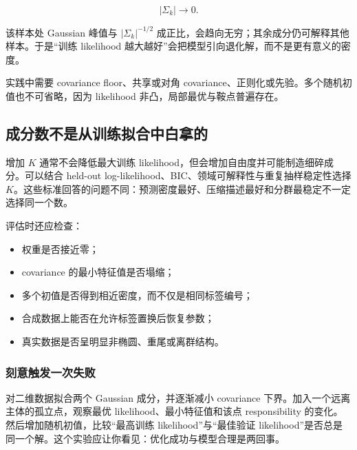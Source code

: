 \[
|\Sigma_k|\to0.
\]

该样本处 Gaussian 峰值与 \(|\Sigma_k|^{-1/2}\) 成正比，会趋向无穷；其余成分仍可解释其他样本。于是``训练 likelihood 越大越好''会把模型引向退化解，而不是更有意义的密度。

实践中需要 covariance floor、共享或对角 covariance、正则化或先验。多个随机初值也不可省略，因为 likelihood 非凸，局部最优与鞍点普遍存在。

\subsection{成分数不是从训练拟合中白拿的}

增加 \(K\) 通常不会降低最大训练 likelihood，但会增加自由度并可能制造细碎成分。可以结合 held-out log-likelihood、BIC、领域可解释性与重复抽样稳定性选择 \(K\)。这些标准回答的问题不同：预测密度最好、压缩描述最好和分群最稳定不一定选择同一个数。

评估时还应检查：

\begin{itemize}
\tightlist
\item
  权重是否接近零；
\item
  covariance 的最小特征值是否塌缩；
\item
  多个初值是否得到相近密度，而不仅是相同标签编号；
\item
  合成数据上能否在允许标签置换后恢复参数；
\item
  真实数据是否呈明显非椭圆、重尾或离群结构。
\end{itemize}

\subsubsection{刻意触发一次失败}

对二维数据拟合两个 Gaussian 成分，并逐渐减小 covariance 下界。加入一个远离主体的孤立点，观察最优 likelihood、最小特征值和该点 responsibility 的变化。然后增加随机初值，比较``最高训练 likelihood''与``最佳验证 likelihood''是否总是同一个解。这个实验应让你看见：优化成功与模型合理是两回事。
